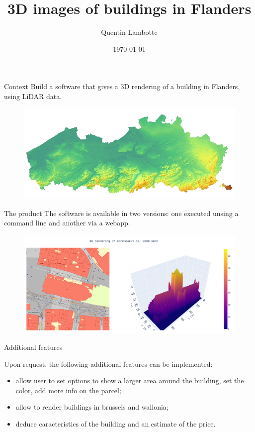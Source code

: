 \documentclass[handout,10pt,hyperref={urlcolor=orange}]{beamer}
\title{3D images of buildings in Flanders}
\date{\today}
\author{Quentin Lambotte}
\begin{document}
\maketitle

\begin{frame}{Context}
  Build a software that gives a 3D rendering of a building in Flanders, using LiDAR data.

  \begin{figure}[h]
    \includegraphics[scale=1]{lidar.png}
    \centering
  \end{figure}
\end{frame}

\begin{frame}{The product}
  The software is available in two versions: one executed unsing a command line and another via a webapp.

  \begin{figure}[h]
    \includegraphics[scale=0.15]{example_t.png}
    \centering
  \end{figure}

\end{frame}
\begin{frame}{Additional features}

  Upon request, the following additional features can be implemented:

  \begin{itemize}
  \item allow user to set options to show a larger area around the building, set the color, add more info on the parcel;
  \item allow to render buildings in brussels and wallonia;
  \item deduce caracteristics of the building and an estimate of the price.
  \end{itemize}

\end{frame}
\end{document}
